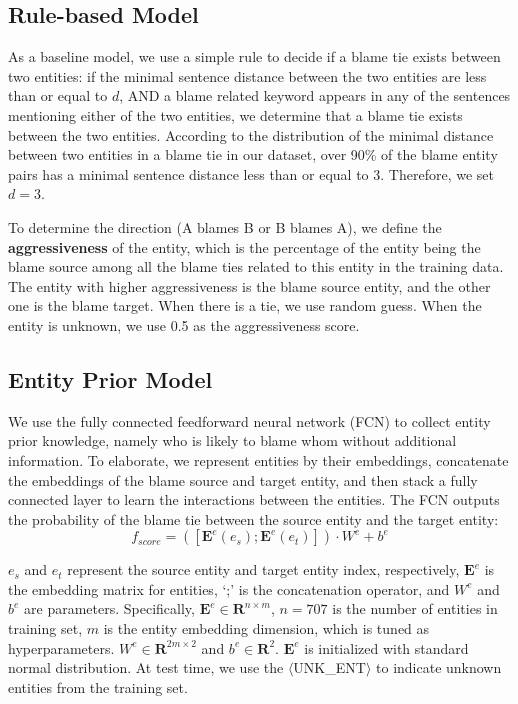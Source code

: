 \documentclass[letterpaper]{article} %
\begin{document}
\subsection{Rule-based Model}
As a baseline model, we use a simple rule to decide if a blame tie exists between two entities: if the minimal sentence distance between the two entities are less than or equal to $d$, AND a blame related keyword appears in any of the sentences mentioning either of the two entities, we determine that a blame tie exists between the two entities. According to the distribution of the minimal distance between two entities in a blame tie in our dataset, over 90\% of the blame entity pairs has a minimal sentence distance less than or equal to 3. Therefore, we set $d=3$.

To determine the direction (A blames B or B blames A), we define the {\bf aggressiveness} of the entity, which is the percentage of the entity being the blame source among all the blame ties related to this entity in the training data. The entity with higher aggressiveness is the blame source entity, and the other one is the blame target. When there is a tie, we use random guess. When the entity is unknown, we use 0.5 as the aggressiveness score.

\subsection{Entity Prior Model}
\label{entitymodel}
We use the fully connected feedforward neural network (FCN) to collect entity prior knowledge, namely who is likely to blame whom without additional information. To elaborate, we represent entities by their embeddings, concatenate the embeddings of the blame source and target entity, and then stack a fully connected layer to learn the interactions between the entities. The FCN outputs the probability of the blame tie between the source entity and the target entity: $$f_{score} = ([\mathbf{E}^e(e_s); \mathbf{E}^e(e_t)]) \cdot W^e + b^e $$

$e_s$ and $e_t$ represent the source entity and target entity index, respectively, $\mathbf{E}^e$ is the embedding matrix for entities, `;' is the concatenation operator, and $W^e$ and $b^e$ are parameters. Specifically, $\mathbf{E}^e \in \mathbf{R}^{n\times m}$, $n=707$ is the number of entities in training set, $m$ is the entity embedding dimension, which is tuned as hyperparameters. $W^e \in \mathbf{R}^{2m\times 2}$ and $b^e \in \mathbf{R}^{2} $. $\mathbf{E}^e$ is initialized with standard normal distribution. At test time, we use the $\langle$UNK\_ENT$\rangle$ to indicate unknown entities from the training set.
\end{document}
